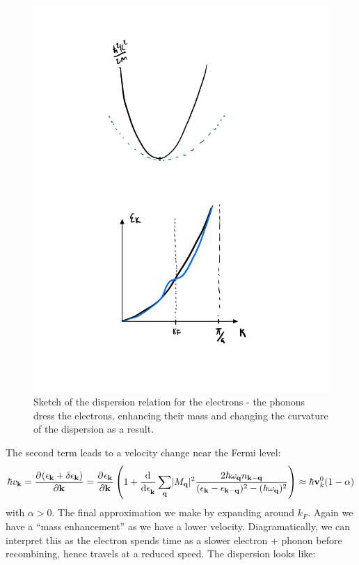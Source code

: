 \begin{figure}[htbp]
    \centering
    \includegraphics[scale=0.5]{Images/fig-enhancedmassparabola.pdf}
    \caption{Sketch of the dispersion relation for the electrons - the phonons dress the electrons, enhancing their mass and changing the curvature of the dispersion as a result.}
    \label{fig-enhancedmassparabola}
\end{figure}

The second term leads to a velocity change near the Fermi level:
\begin{equation}
    \hbar v_{\v{k}} = \dpd{(\e_{\v{k}} + \delta \e_{\v{k}})}{\v{k}} = \dpd{\e_{\v{k}}}{\v{k}}\left(1 + \dod{}{\e_{\v{k}}}\sum_{\v{q}}\abs{M_\v{q}}^2 \frac{2\hbar \omega_{\v{q}}n_{\v{k} - \v{q}}}{(\e_{\v{k}} - \e_{\v{k} - \v{q}})^2 - (\hbar \omega_{\v{q}})^2} \right) \approx \hbar \v{v}_k^0(1-\alpha)
\end{equation}
with $\alpha > 0$. The final approximation we make by expanding around $k_F$. Again we have a ``mass enhancement'' as we have a lower velocity. Diagramatically, we can interpret this as the electron spends time as a slower electron + phonon before recombining, hence travels at a reduced speed. The dispersion looks like:

